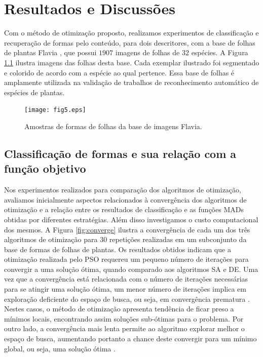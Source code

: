
\chapter{Resultados e Discussões \label{chap:resultados}}


Com o método de otimização proposto, realizamos experimentos de classificação e recuperação de formas pelo conteúdo, para dois descritores, com a base de folhas de plantas Flavia \cite{4458016},  que possui $1907$ imagens de folhas de $32$ espécies. A Figura \ref{fig:bases} ilustra imagens das folhas desta base. Cada exemplar ilustrado foi segmentado e colorido de acordo com a espécie ao qual pertence. Essa base de folhas é amplamente utilizada na validação de trabalhos de reconhecimento automático de espécies de plantas. 

\begin{figure}[!htb]
\caption{\label{fig:bases}Amostras de formas de folhas da base de imagens Flavia.}

\centering
\texttt{[image: fig5.eps]}
\end{figure}




\section{Classificação de formas e sua relação com  a função objetivo}
Nos experimentos realizados para comparação dos algoritmos de otimização, avaliamos inicialmente aspectos  relacionados à  convergência dos algoritmos de otimização e a relação entre os resultados de classificação e as funções \gls{MAD}s obtidas por diferentes estratégias. Além disso investigamos o custo computacional dos mesmos. A Figura \ref{fig:converge} ilustra a convergência de cada um dos três algoritmos de otimização para $30$ repetições realizadas em um subconjunto da base de formas de folhas de plantas. Os resultados obtidos indicam que a otimização realizada pelo \gls{PSO} requereu um pequeno número de iterações para convergir a uma solução ótima, quando comparado aos algoritmos \gls{SA} e \gls{DE}. Uma vez que a convergência está relacionada com o número de iterações necessárias para se atingir uma solução ótima, um menor número de iterações implica em exploração deficiente do espaço de busca, ou seja, em convergência prematura \cite{Andries:2007}. Nestes casos, o método de otimização apresenta tendência de ficar preso a mínimos locais, encontrando assim soluções sub-ótimas para o problema. Por outro lado, a convergência mais lenta permite ao algoritmo explorar melhor o espaço de busca, aumentando portanto a chance deste convergir para um mínimo global, ou seja, uma solução ótima \cite{Andries:2007}.
 
